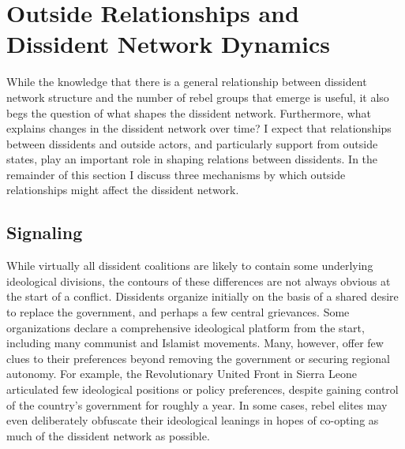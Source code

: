 \section{Outside Relationships and Dissident Network Dynamics}

While the knowledge that there is a general relationship between dissident network structure and the number of rebel groups that emerge is useful, it also begs the question of what shapes the dissident network. Furthermore, what explains changes in the dissident network over time? I expect that relationships between dissidents and outside actors, and particularly support from outside states, play an important role in shaping relations between dissidents. In the remainder of this section I discuss three mechanisms by which outside relationships might affect the dissident network.

\subsection{Signaling}

While virtually all dissident coalitions are likely to contain some underlying ideological divisions, the contours of these differences are not always obvious at the start of a conflict. Dissidents organize initially on the basis of a shared desire to replace the government, and perhaps a few central grievances. Some organizations declare a  comprehensive ideological platform from the start, including many communist and Islamist movements. Many, however, offer few clues to their preferences beyond removing the government or securing regional autonomy. For example, the Revolutionary United Front in Sierra Leone articulated few ideological positions or policy preferences, despite gaining control of the country's government for roughly a year. In some cases, rebel elites may even deliberately obfuscate their ideological leanings in hopes of co-opting as much of the dissident network as possible.

